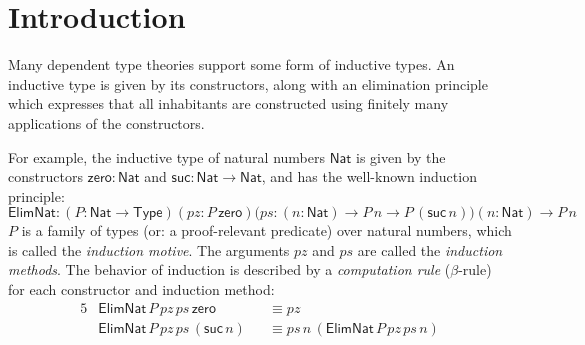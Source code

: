 \documentclass[dvipsnames]{lmcs} %
\newcommand{\ra}{\rightarrow}
\newcommand{\Nat}{\mathsf{Nat}}
\newcommand{\zero}{\mathsf{zero}}
\newcommand{\suc}{\mathsf{suc}}
\newcommand{\Elim}{\mathsf{Elim}}
\newcommand{\1}{\mathsf{1}} \renewcommand{\Pr}{\mathsf{Pr}}
\theoremstyle{plain}\newtheorem{satz}[thm]{Satz} %
\begin{document}
\maketitle


\section{Introduction}
\label{sec:intro}

Many dependent type theories support some form of inductive types. An
inductive type is given by its constructors, along with an elimination
principle which expresses that all inhabitants are constructed using
finitely many applications of the constructors.

For example, the inductive type of natural numbers $\Nat$ is given by
the constructors $\zero:\Nat$ and $\suc:\Nat \ra \Nat$, and has the
well-known induction principle:
\[
  \Elim\Nat:(P:\Nat \ra \mathsf{Type})(pz: P\,\zero)\big(ps:(n:\Nat)\ra P\,n\ra P\,(\suc\,n)\big)(n:\Nat)\ra P\,n
\]
\noindent $P$ is a family of types (or: a proof-relevant predicate) over natural
numbers, which is called the \emph{induction motive}. The arguments $pz$ and
$ps$ are called the \emph{induction methods}. The behavior of induction is
described by a \emph{computation rule} ($\beta$-rule) for each constructor
and induction method:
\begin{alignat*}{5}
  & \Elim\Nat\,P\,pz\,ps\,\zero && \equiv pz \\
  & \Elim\Nat\,P\,pz\,ps\,(\suc\,n) && \equiv ps\,n\,(\Elim\Nat\,P\,pz\,ps\,n)
\end{alignat*}
\end{document}
